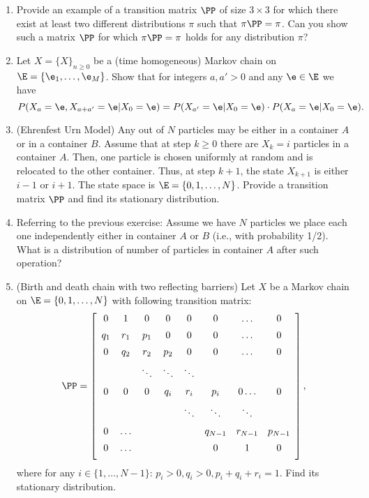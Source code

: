 \documentclass[a4paper,12pt]{article}
\begin{document}
\begin{enumerate}
\item
Provide an example of a transition matrix $\PP$ of size $3\times 3$ for which there exist
at least two different distributions $\pi$ such that  $\pi\PP=\pi$.
Can you show such a matrix $\PP$ for which $\pi\PP=\pi$ holds for any distribution $\pi$?

\item
Let  $X=\{X\}_{n\geq 0}$ be a (time homogeneous) Markov chain on $\E=\{\e_1,\ldots,\e_M\}$.
Show that for integers  $a,a'>0$ and any  $\e\in\E$ we have
$$P(X_a=\e, X_{a+a'}=\e | X_0=\e) = P(X_{a'}=\e |X_0=\e)\cdot P(X_{a}=\e |X_0=\e).$$

\item(Ehrenfest Urn Model) Any out of $N$ particles 
may be either in a container $A$ or in a container $B$. Assume that at step $k\geq 0$ there are 
$X_k=i$ particles in a container $A$. Then, one particle is chosen uniformly at random 
and is relocated to the other container. Thus,  at step $k+1$, the state $X_{k+1}$ is either $i-1$ or $i+1$.
The state space is $\E=\{0,1,\ldots,N\}$. Provide a transition matrix $\PP$ and find its stationary distribution.


\item 
Referring to the previous exercise: Assume we have $N$ particles we place each one independently
either in container $A$ or $B$ (i.e., with probability 1/2).
What is a distribution of number of particles in container $A$ after such operation?

\item(Birth and death chain with two reflecting barriers)
Let  $X$ be a Markov chain on $\E=\{0,1,\ldots,N\}$ with following transition matrix:
$$\PP=\left[
\begin{array}{ccccccccc}
0 & 1 & 0 & 0 & 0  & 0 &\ldots & 0 \\[5pt]
q_1 & r_1 & p_1 & 0 & 0 & 0 &\ldots & 0 \\[5pt]
0 & q_2 & r_2 & p_2 & 0 & 0 &\ldots & 0\\[5pt]
  &      & \ddots& \ddots& \ddots\\[5pt]
0 & 0 & 0 & q_i & r_i & p_i &0 \ldots &0 \\[5pt]
 &  & &      & \ddots& \ddots& \ddots\\[5pt]
 0&\ldots &  & &      & q_{N-1} & r_{N-1} & p_{N-1} \\[5pt]
 0&\ldots &  & &      & 0 & 1 & 0 \\[5pt]
    \end{array}\right],$$
    where for any  $i\in\{1,\ldots,N-1\}$: $p_i>0, q_i>0, p_i+q_i+r_i=1$. 
    Find its stationary distribution.


\end{enumerate}
\end{document}
